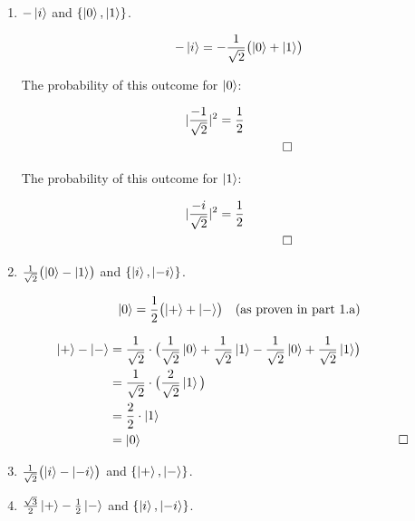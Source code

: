 \documentclass{article}
\begin{document}
\begin{enumerate}
\begin{enumerate}
		\item $-\ket{i}$ and $\{\ket0, \ket1\}$.


\begin{align*}
	-\ket{i} = -\frac{1}{\sqrt{2}} \bigl(\ket{0} + \ket{1}\bigr) \\
\end{align*}

The probability of this outcome for $\ket{0}$:

\begin{align*}
  |\frac{-1}{\sqrt{2}}|^2 = \frac{1}{2} \\ &&\qedhere
\end{align*}

The probability of this outcome for $\ket{1}$:

\begin{align*}
  |\frac{-i}{\sqrt{2}}|^2 = \frac{1}{2} \\ &&\qedhere
\end{align*}

		\item $ \frac{1}{\sqrt{2}} \bigl( \ket{0} - \ket{1} \bigr) $ and $\{\ket{i}, \ket{-i}\}$.

\begin{align*}
	\ket{0} = \frac{1}{2} \bigl(\ket{+} + \ket{-}\bigr) &&\text{(as proven in part 1.a)}
\end{align*}

\begin{align*}
\ket{+} - \ket{-} &= \frac{1}{\sqrt{2}} \cdot \bigl(\frac{1}{\sqrt{2}}\ket{0} + \frac{1}{\sqrt{2}}\ket{1} - \frac{1}{\sqrt{2}}\ket{0} + \frac{1}{\sqrt{2}}\ket{1}\bigr) \\
    		&= \frac{1}{\sqrt{2}} \cdot \bigl(\frac{2}{\sqrt{2}} \ket{1} \bigl) \\
    		&= \frac{2}{2} \cdot \ket{1} \\
   		&= \ket{0} &&\qedhere
\end{align*}




		\item $\frac{1}{\sqrt{2}} \bigl(\ket{i} - \ket{-i}\bigr)$ and $\{\ket{+}, \ket{-}\}$.
		\item $\frac{\sqrt{3}}{2} \ket{+} - \frac{1}{2} \ket{-}$ and $\{\ket{i}, \ket{-i}\}$.
	\end{enumerate}

\end{enumerate}

\newpage
\end{document}
